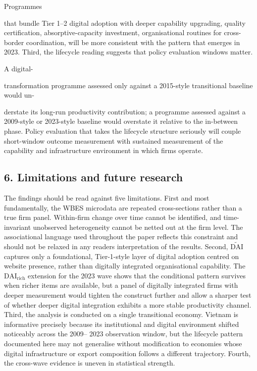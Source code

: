 \documentclass[12pt,a4paper]{article}
\begin{document}
Programmes

that bundle Tier 1--2 digital adoption with deeper capability upgrading,
quality certification, absorptive-capacity investment, organisational
routines for cross-border coordination, will be more consistent with the
pattern that emerges in 2023. Third, the lifecycle reading suggests that
policy evaluation windows matter.

A digital-

transformation programme assessed only against a 2015-style transitional
baseline would un-

derstate its long-run productivity contribution; a programme assessed
against a 2009-style or 2023-style baseline would overstate it relative
to the in-between phase. Policy evaluation that takes the lifecycle
structure seriously will couple short-window outcome measurement with
sustained measurement of the capability and infrastructure environment
in which firms operate.

\hypertarget{6-limitations-and-future-research}{%
\subsection{6. Limitations and future
research}\label{6-limitations-and-future-research}}

The findings should be read against five limitations. First and most
fundamentally, the WBES microdata are repeated cross-sections rather
than a true firm panel. Within-firm change over time cannot be
identified, and time-invariant unobserved heterogeneity cannot be netted
out at the firm level. The associational language used throughout the
paper reflects this constraint and should not be relaxed in any
reader\textquotesingle s interpretation of the results. Second,
\(\tilde{\mathrm{DAI}}\) captures only a foundational, Tier-1-style
layer of digital adoption centred on website presence, rather than
digitally integrated organisational capability. The
\(\mathrm{DAI}_{\text{rich}}\) extension for the 2023 wave shows that
the conditional pattern survives when richer items are available, but a
panel of digitally integrated firms with deeper measurement would
tighten the construct further and allow a sharper test of whether deeper
digital integration exhibits a more stable productivity channel. Third,
the analysis is conducted on a single transitional economy. Vietnam is
informative precisely because its institutional and digital environment
shifted noticeably across the 2009-- 2023 observation window, but the
lifecycle pattern documented here may not generalise without
modification to economies whose digital infrastructure or export
composition follows a different trajectory. Fourth, the cross-wave
evidence is uneven in statistical strength.
\end{document}
